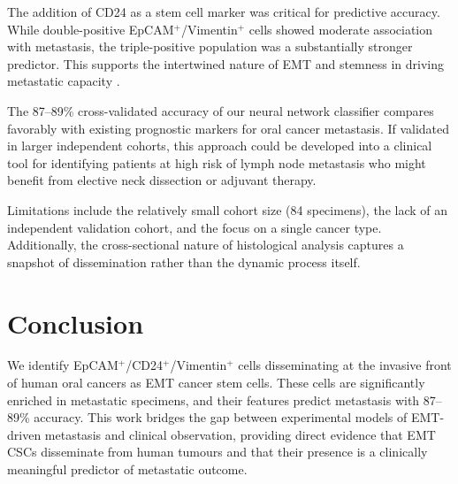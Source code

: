 \documentclass[11pt]{article}
\begin{document}
The addition of CD24 as a stem cell marker was critical for predictive accuracy. While double-positive EpCAM$^+$/Vimentin$^+$ cells showed moderate association with metastasis, the triple-positive population was a substantially stronger predictor. This supports the intertwined nature of EMT and stemness in driving metastatic capacity \citep{mani2008mesenchyme}.

The 87--89\% cross-validated accuracy of our neural network classifier compares favorably with existing prognostic markers for oral cancer metastasis. If validated in larger independent cohorts, this approach could be developed into a clinical tool for identifying patients at high risk of lymph node metastasis who might benefit from elective neck dissection or adjuvant therapy.

Limitations include the relatively small cohort size (84 specimens), the lack of an independent validation cohort, and the focus on a single cancer type. Additionally, the cross-sectional nature of histological analysis captures a snapshot of dissemination rather than the dynamic process itself.

\section{Conclusion}

We identify EpCAM$^+$/CD24$^+$/Vimentin$^+$ cells disseminating at the invasive front of human oral cancers as EMT cancer stem cells. These cells are significantly enriched in metastatic specimens, and their features predict metastasis with 87--89\% accuracy. This work bridges the gap between experimental models of EMT-driven metastasis and clinical observation, providing direct evidence that EMT CSCs disseminate from human tumours and that their presence is a clinically meaningful predictor of metastatic outcome.



\end{document}
